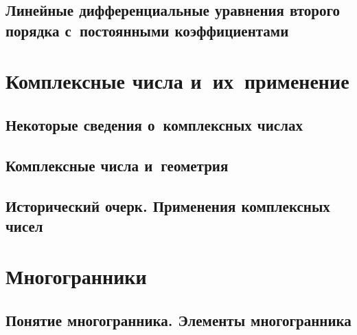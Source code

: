 \documentclass[14pt, oneside]{extbook}
\begin{document}
\section{Линейные дифференциальные уравнения второго порядка 
с~постоянными коэффициентами}



\chapter{Комплексные числа и~их~применение}
\section{Некоторые сведения о~комплексных числах}

\section{Комплексные числа и~геометрия}

\section{Исторический очерк. Применения комплексных чисел}



\chapter{Многогранники}
\section{Понятие многогранника. Элементы многогранника}

\end{document}
